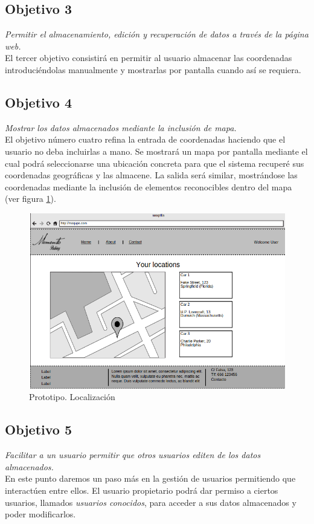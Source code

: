 \subsection{Objetivo 3}
\emph{Permitir el almacenamiento, edición y recuperación de datos a través de la página web.}\\
El tercer objetivo consistirá en permitir al usuario almacenar las coordenadas introduciéndolas manualmente y mostrarlas por pantalla cuando así se requiera.

\subsection{Objetivo 4}
\emph{Mostrar los datos almacenados mediante la inclusión de mapa.}\\
El objetivo número cuatro refina la entrada de coordenadas haciendo que el usuario no deba incluirlas a mano. Se mostrará un mapa por pantalla mediante el cual podrá seleccionarse una ubicación concreta para que el sistema recuperé sus coordenadas geográficas y las almacene. La salida será similar, mostrándose las coordenadas mediante la inclusión de elementos reconocibles dentro del mapa (ver figura \ref{fig:prototipo_locations}).

\begin{figure}[h!btp]
	\centering
	\includegraphics[scale=0.5, fbox={\fboxrule} 4mm]{images/02-objetivos/04-prototipo_locations.png}
	\caption{Prototipo. Localización}
	\label{fig:prototipo_locations}
\end{figure}


\subsection{Objetivo 5}
\emph{Facilitar a un usuario permitir que otros usuarios editen de los datos almacenados.}\\
En este punto daremos un paso más en la gestión de usuarios permitiendo que interactúen entre ellos. El usuario propietario podrá dar permiso a ciertos usuarios, llamados \textit{usuarios conocidos}, para acceder a sus datos almacenados y poder modificarlos.


